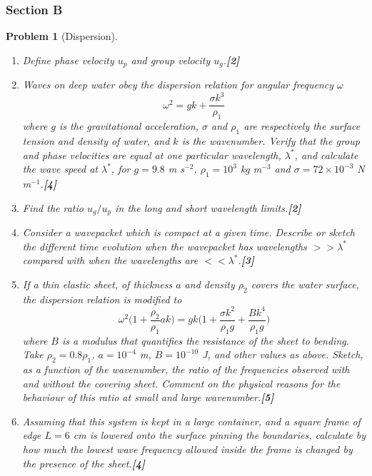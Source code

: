 \documentclass[a4paper]{article}
\theoremstyle{new}
\newtheorem{qns}{Problem}[subsection]
\begin{document}
\subsubsection{Section B}
\begin{qns}[Dispersion]\leavevmode
\begin{enumerate}[label=(\roman*)]
\item Define phase velocity $u_p$ and group velocity $u_g$.\hfill\textbf{[2]}
\item Waves on deep water obey the dispersion relation for angular frequency $\omega$
$$\omega^2=gk+\frac{\sigma k^3}{\rho_1}$$
where $g$ is the gravitational acceleration, $\sigma$ and $\rho_1$ are respectively the surface tension and density of water, and $k$ is the wavenumber. Verify that the group and phase velocities are equal at one particular wavelength, $\lambda^*$, and calculate the wave speed at $\lambda^*$, for $g = 9.8$ m s$^{−2}$, $\rho_1 = 10^3$ kg m$^{−3}$ and $\sigma = 72\times 10^{-3}$ N m$^{−1}$.\hfill\textbf{[4]}
\item Find the ratio $u_g/u_p$ in the long and short wavelength limits.\hfill\textbf{[2]}
\item Consider a wavepacket which is compact at a given time. Describe or sketch the different time evolution when the wavepacket has wavelengths $>>\lambda^*$ compared with when the wavelengths are $<<\lambda^*$.\hfill\textbf{[3]}
\item If a thin elastic sheet, of thickness $a$ and density $\rho_2$ covers the water surface, the dispersion relation is modified to
$$\omega^2\bigg(1+\frac{\rho_2}{\rho_1}ak\bigg)=gk\bigg(1+\frac{\sigma k^2}{\rho_1g}+\frac{Bk^4}{\rho_1g}\bigg)$$
where $B$ is a modulus that quantifies the resistance of the sheet to bending. Take $\rho_2 = 0.8\rho_1$, $a = 10^{−4}$ m, $B = 10^{−10}$ J, and other values as above. Sketch, as a function of the wavenumber, the ratio of the frequencies observed with and without the covering sheet. Comment on the physical reasons for the behaviour of this ratio at small and large wavenumber.\hfill\textbf{[5]}
\item Assuming that this system is kept in a large container, and a square frame of edge $L = 6$ cm is lowered onto the surface pinning the boundaries, calculate by how much the lowest wave frequency allowed inside the frame is changed by the presence of the sheet.\hfill\textbf{[4]}
\end{enumerate}
\end{qns}
\end{document}
